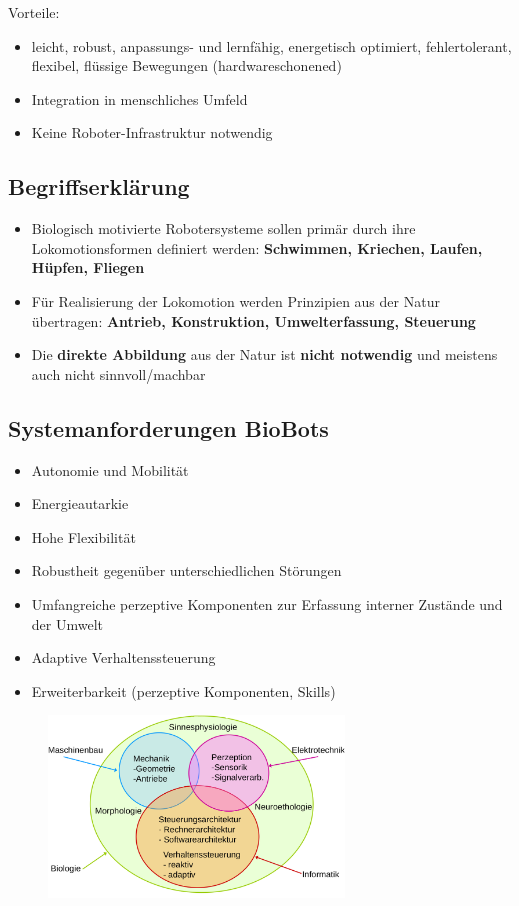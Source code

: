 Vorteile:
\begin{itemize}
	\item leicht, robust, anpassungs- und lernfähig, energetisch optimiert, fehlertolerant, flexibel, flüssige Bewegungen (hardwareschonened)
	\item Integration in menschliches Umfeld
	\item Keine Roboter-Infrastruktur notwendig
\end{itemize}

\subsection{Begriffserklärung}
\begin{itemize}
	\item Biologisch motivierte Robotersysteme sollen primär durch ihre Lokomotionsformen definiert werden: \textbf{Schwimmen, Kriechen, Laufen, Hüpfen, Fliegen}
	\item Für Realisierung der Lokomotion werden Prinzipien aus der Natur übertragen: \textbf{Antrieb, Konstruktion, Umwelterfassung, Steuerung}
	\item Die \textbf{direkte Abbildung} aus der Natur ist \textbf{nicht notwendig} und meistens auch nicht sinnvoll/machbar
\end{itemize}

\subsection{Systemanforderungen BioBots}
\begin{itemize}
	\item Autonomie und Mobilität
	\item Energieautarkie
	\item Hohe Flexibilität
	\item Robustheit gegenüber unterschiedlichen Störungen
	\item Umfangreiche perzeptive Komponenten zur Erfassung interner Zustände und der Umwelt
	\item Adaptive Verhaltenssteuerung
	\item Erweiterbarkeit (perzeptive Komponenten, Skills)	
\end{itemize}

\begin{figure}
	\centering
	\includegraphics[width=0.7\textwidth]{figures/interdisziplinaer.png}
\end{figure}

